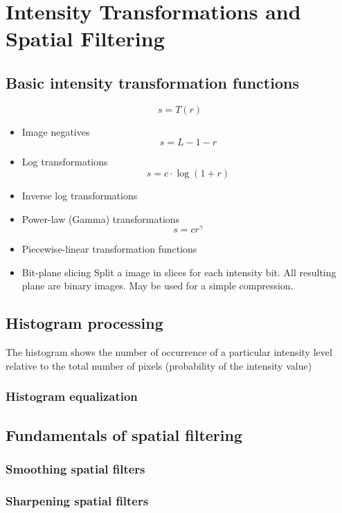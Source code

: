 \section{Intensity Transformations and Spatial Filtering }

\subsection{Basic intensity transformation functions}
\begin{equation}
s = T(r)
\end{equation}

\begin{itemize}
	\item Image negatives
		\begin{equation}
			s = L-1-r
		\end{equation}
	\item Log transformations
		\begin{equation}
			s = c \cdot \log{(1 + r)}
		\end{equation}
	\item Inverse log transformations
	\item Power-law (Gamma) transformations
		\begin{equation}
			s = c r^\gamma
		\end{equation}
	\item Piecewise-linear transformation functions
	\item Bit-plane slicing
		Split a image in slices for each intensity bit.  All resulting plane are binary images.
		May be used for a simple compression.
	
\end{itemize}

\subsection{Histogram processing}
The histogram shows the number of occurrence of a particular intensity level relative to the total number of pixels (probability of the intensity value)
\subsubsection{Histogram equalization}

\subsection{Fundamentals of spatial filtering}
\subsubsection{Smoothing spatial filters}
\subsubsection{Sharpening spatial filters}
